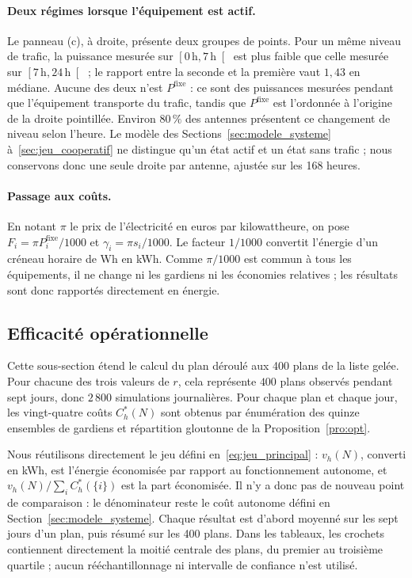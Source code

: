 \paragraph{Deux régimes lorsque l'équipement est actif.}
Le panneau (c), à droite, présente deux groupes de points. Pour un même
niveau de trafic, la puissance mesurée sur
\(\left[0\,\mathrm h,7\,\mathrm h\right[\) est plus faible que celle mesurée
sur \(\left[7\,\mathrm h,24\,\mathrm h\right[\) ; le rapport entre la seconde et la première
vaut \(1{,}43\) en médiane. Aucune des deux n'est
\(P^{\mathrm{fixe}}\) : ce sont des puissances mesurées pendant que
l'équipement transporte du trafic, tandis que \(P^{\mathrm{fixe}}\) est
l'ordonnée à l'origine de la droite pointillée. Environ \(80\,\%\) des
antennes présentent ce changement de niveau selon l'heure. Le modèle des
Sections~\ref{sec:modele_systeme} à~\ref{sec:jeu_cooperatif} ne distingue
qu'un état actif et un état sans trafic ; nous
conservons donc une seule droite par antenne, ajustée sur les 168 heures.

\paragraph{Passage aux coûts.}
En notant \(\pi\) le prix de l'électricité en euros par kilowattheure, on pose
\(F_i=\pi P_i^{\mathrm{fixe}}/1000\) et \(\gamma_i=\pi s_i/1000\). Le facteur
\(1/1000\) convertit l'énergie d'un créneau horaire de Wh en kWh. Comme
\(\pi/1000\) est commun à tous les équipements, il ne change ni les gardiens
ni les économies relatives ; les résultats sont donc rapportés directement
en énergie.

\subsection{Efficacité opérationnelle}
\label{subsec:efficacite_operationnelle}

Cette sous-section étend le calcul du plan déroulé aux 400 plans de
la liste gelée. Pour chacune des trois valeurs de \(r\), cela représente
\(400\) plans observés pendant sept jours, donc \(2\,800\) simulations
journalières. Pour chaque plan et chaque jour, les vingt-quatre coûts
\(C_h^*(N)\) sont obtenus par énumération des quinze ensembles de gardiens et
répartition gloutonne de la Proposition~\ref{pro:opt}.

Nous réutilisons directement le jeu défini en~\eqref{eq:jeu_principal} :
\(v_h(N)\), converti en kWh, est l'énergie économisée par rapport au
fonctionnement autonome, et
\(v_h(N)/\sum_i C_h^*(\{i\})\) est la part économisée. Il n'y a donc pas de
nouveau point de comparaison : le dénominateur reste le coût autonome défini
en Section~\ref{sec:modele_systeme}. Chaque résultat est d'abord
moyenné sur les sept jours d'un plan, puis résumé sur les 400 plans. Dans
les tableaux, les crochets contiennent directement la moitié centrale des
plans, du premier au troisième quartile ; aucun rééchantillonnage ni intervalle
de confiance n'est utilisé.

